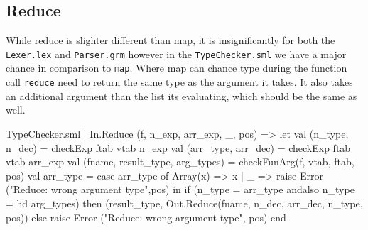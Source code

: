 \documentclass[11pt,a4paper,oneside]{report}
\begin{document}
\subsection*{Reduce}
While reduce is slighter different than map, it is insignificantly for both the \texttt{Lexer.lex} and \texttt{Parser.grm} however in the \texttt{TypeChecker.sml} we have a major chance in comparison to \texttt{map}. Where map can chance type during the function call \texttt{reduce} need to return the same type as the argument it takes. It also takes an additional argument than the list its evaluating, which should be the same as well.
\begin{code}[firstnumber=253]{TypeChecker.sml}
| In.Reduce (f, n_exp, arr_exp, _, pos)
      =>
      let val (n_type, n_dec) = checkExp ftab vtab n_exp
          val (arr_type, arr_dec) = checkExp ftab vtab arr_exp
          val (fname, result_type, arg_types) = checkFunArg(f, vtab, ftab, pos)
          val arr_type = case arr_type of
                      Array(x) => x
                    | _ => raise Error ("Reduce: wrong argument type",pos)
      in
          if (n_type = arr_type andalso n_type = hd arg_types)
          then (result_type, Out.Reduce(fname, n_dec, arr_dec, n_type, pos))
          else raise Error ("Reduce: wrong argument type", pos)
      end
\end{code}
\end{document}
